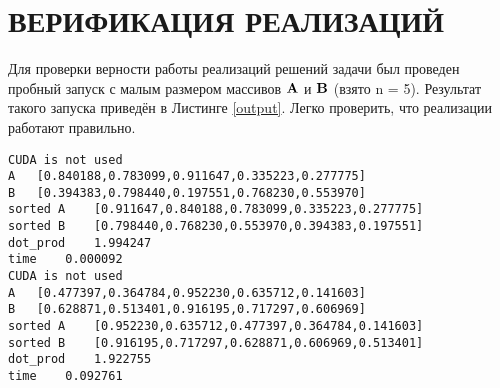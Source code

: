 \section{ВЕРИФИКАЦИЯ РЕАЛИЗАЦИЙ}
Для проверки верности работы реализаций решений задачи был проведен пробный запуск с малым размером массивов $\vb{A}$ и $\vb{B}$ (взято n = 5). Результат такого запуска приведён в Листинге \ref{output}. Легко проверить, что реализации работают правильно.
\begin{lstlisting}[label={output}, caption={Результат работы реализаций при n = 5.}]
CUDA is not used
A	[0.840188,0.783099,0.911647,0.335223,0.277775]
B	[0.394383,0.798440,0.197551,0.768230,0.553970]
sorted A	[0.911647,0.840188,0.783099,0.335223,0.277775]
sorted B	[0.798440,0.768230,0.553970,0.394383,0.197551]
dot_prod	1.994247
time	0.000092
CUDA is not used
A	[0.477397,0.364784,0.952230,0.635712,0.141603]
B	[0.628871,0.513401,0.916195,0.717297,0.606969]
sorted A	[0.952230,0.635712,0.477397,0.364784,0.141603]
sorted B	[0.916195,0.717297,0.628871,0.606969,0.513401]
dot_prod    1.922755
time	0.092761
\end{lstlisting}
